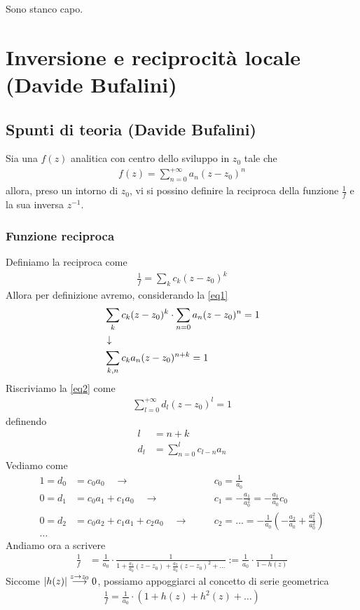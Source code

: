 Sono stanco capo.

\newpage


\section{Inversione e reciprocità locale (Davide Bufalini)}

\subsection{Spunti di teoria (Davide Bufalini)}

Sia una $f(z)$ analitica con centro dello sviluppo in $z_0$ tale che
\begin{align}
	f(z) = \sum_{n=0}^{+\infty} a_n (z-z_0)^n	\label{eq1}
\end{align}
allora, preso un intorno di $z_0$, vi si possino definire la reciproca della funzione $\frac{1}{f}$ e la sua inversa $z^{-1}$.

\subsubsection{Funzione reciproca}

Definiamo la reciproca come
\begin{align}
	\frac{1}{f} = \sum_{k} c_k (z-z_0)^k
\end{align}
Allora per definizione avremo, considerando la \ref{eq1}
\begin{align}
	&\sum_{k} c_k (z-z_0)^k \cdot \sum_{n=0} a_n (z-z_0)^n = 1\\ &\downarrow \nonumber \\
	&\sum_{k,n} c_ka_n (z-z_0)^{n+k} = 1 \label{eq2}
\end{align}
Riscriviamo la \ref{eq2} come
\begin{align}
	\sum_{l=0}^{+\infty} d_l (z-z_0)^l = 1
\end{align}
definendo
\begin{align}
	l &= n+k\\
	d_l &= \sum_{n=0}^{l}c_{l-n}a_n
\end{align}
Vediamo come
\begin{align}
	1 = d_0 &= c_0a_0 \quad \rightarrow& \quad &c_0 = \frac{1}{a_0}\\
	0 = d_1 &= c_0a_1 + c_1a_0 \quad \rightarrow& \quad &c_1 = -\frac{a_1}{a_0^2} = -\frac{a_1}{a_0} c_0\\
	0 = d_2 &= c_0a_2 + c_1a_1 + c_2a_0 \quad \rightarrow& \quad &c_2 = \dots = -\frac{1}{a_0}\left( -\frac{a_2}{a_0} + \frac{a_1^2}{a_0^2} \right) \\
	\dots \nonumber
\end{align}
Andiamo ora a scrivere
\begin{align}
	\frac{1}{f} &= \frac{1}{a_0}\cdot \frac{1}{1 + \frac{a_1}{a_0}(z-z_0) + \frac{a_2}{a_0} (z-z_0)^2 + \dots} := \frac{1}{a_0} \cdot \frac{1}{1-h(z)}
\end{align}
Siccome $|h(z)| \overset{z \rightarrow z_0}{\longrightarrow} 0$, possiamo appoggiarci al concetto di serie geometrica
\begin{align}
	\frac{1}{f} = \frac{1}{a_0}\cdot (1 + h(z) + h^2(z) + \dots)
\end{align}

